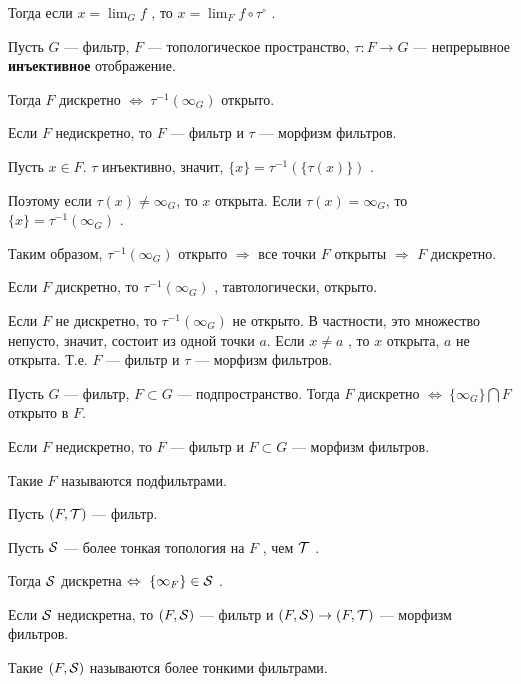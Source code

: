 Тогда если \( \displaystyle x = \lim_{G} f \) , то \( \displaystyle x = \lim_{F} f\circ \tau^\circ \) .

\pagebreak

\SSbullet 

\SSsect Пусть \( G \) --- фильтр, \( F \) --- топологическое пространство, \( \tau : F \rightarrow G \) --- непрерывное \textbf{инъективное} отображение.

Тогда \( F \) дискретно \( \Leftrightarrow~ \tau^{-1}(\infty_G) \) открыто.

Если \( F \) недискретно, то \( F \) --- фильтр и \( \tau \) --- морфизм фильтров. 

\SSproof

Пусть \( x \in F \). \( \tau \) инъективно, значит, \( \{x\} = \tau^{-1}(\{\tau(x)\}) \) .

Поэтому если \( \tau(x) \neq \infty_G \), то \( x \) открыта.
Если \( \tau(x) = \infty_G \), то \( \{x\} = \tau^{-1}(\infty_G) \) .

Таким образом, \( \tau^{-1}(\infty_G) \) открыто \( \Rightarrow \) все точки \( F \) открыты \( \Rightarrow \) \( F \) дискретно.

Если \( F \) дискретно, то \( \tau^{-1}(\infty_G) \) , тавтологически,  открыто.

Если \( F \) не дискретно, то \( \tau^{-1}(\infty_G) \) не открыто.
В частности, это множество непусто, значит, состоит из одной точки \( a \). Если \( x \neq a \) , то \( x \) открыта, \( a \) не открыта. Т.е. \( F \) --- фильтр и \( \tau \) --- морфизм фильтров.

\SSendp

\SSsect Пусть \( G \) --- фильтр, \( F \subset G \) --- подпространство. Тогда \( F \) дискретно \( \Leftrightarrow~ \{\infty_G\} \bigcap F \) открыто в \( F \).

Если \( F \) недискретно, то \( F \) --- фильтр и \( F \subset G \) --- морфизм фильтров.

Такие \( F \) называются подфильтрами.

\SSsect Пусть \( (F, \mathcal{T} ) \) --- фильтр. 

Пусть \( \mathcal{S} \) --- более тонкая топология на \( F \) , чем \( \mathcal{T} \) .

Тогда \( \mathcal{S} \) дискретна \( \Leftrightarrow~ \{\infty_F\} \in \mathcal{S} \) .

Если \( \mathcal{S} \) недискретна, то \( (F, \mathcal{S} ) \) --- фильтр и \( (F, \mathcal{S} ) \rightarrow (F, \mathcal{T} ) \) --- морфизм фильтров.

Такие \( (F, \mathcal{S} ) \) называются более тонкими фильтрами.

